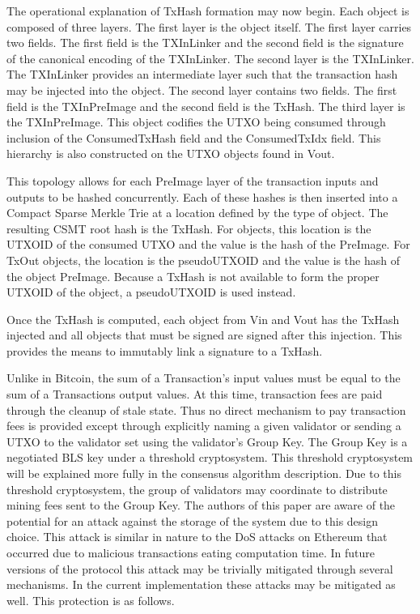 The operational explanation of TxHash formation may now begin.
Each \TxIn{} object is composed of three layers.
The first layer is the \TxIn{} object itself.
The first layer carries two fields.
The first field is the TXInLinker and the second field is the signature
of the canonical encoding of the TXInLinker.
The second layer is the TXInLinker.
The TXInLinker provides an intermediate layer such that the transaction
hash may be injected into the object.
The second layer contains two fields.
The first field is the TXInPreImage and the second field is the TxHash.
The third layer is the TXInPreImage.
This object codifies the UTXO being consumed through inclusion of the
ConsumedTxHash field and the ConsumedTxIdx field.
This hierarchy is also constructed on the UTXO objects found in Vout.

This topology allows for each PreImage layer of the transaction inputs
and outputs to be hashed concurrently.
Each of these hashes is then inserted into a Compact Sparse Merkle Trie
at a location defined by the type of object.
The resulting CSMT root hash is the TxHash.
For \TxIn{} objects, this location is the UTXOID of the consumed UTXO and
the value is the hash of the \TxIn{} PreImage.
For TxOut objects, the location is the pseudoUTXOID and the value is
the hash of the object PreImage.
Because a TxHash is not available to form the proper UTXOID of the
object, a pseudoUTXOID is used instead.

Once the TxHash is computed, each object from Vin and Vout has the
TxHash injected and all objects that must be signed are signed after
this injection.
This provides the means to immutably link a signature to a TxHash.

Unlike in Bitcoin, the sum of a Transaction’s input values must be
equal to the sum of a Transactions output values.
At this time, transaction fees are paid through the cleanup of stale
state.
Thus no direct mechanism to pay transaction fees is provided except
through explicitly naming a given validator or sending a UTXO to the
validator set using the validator’s Group Key.
The Group Key is a negotiated BLS key under a threshold cryptosystem.
This threshold cryptosystem will be explained more fully in the
consensus algorithm description.
Due to this threshold cryptosystem, the group of validators may
coordinate to distribute mining fees sent to the Group Key.
The authors of this paper are aware of the potential for an attack
against the storage of the system due to this design choice.
This attack is similar in nature to the DoS attacks on Ethereum that
occurred due to malicious transactions eating computation time.
In future versions of the protocol this attack may be trivially
mitigated through several mechanisms.
In the current implementation these attacks may be mitigated as well.
This protection is as follows.

